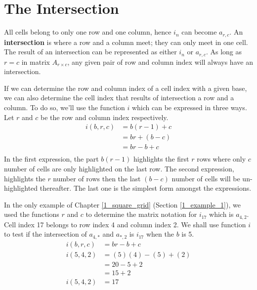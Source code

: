 \documentclass[letterpaper, twoside,12pt]{article}
\begin{document}
    \newpage

    \section{The Intersection} \label{intersection}
    All cells belong to only one row and one column, hence $i_n$ can become $a_{r,c}$. An \textbf{intersection} is where a row and a column meet; they can only meet in one cell. The result of an intersection can be represented as either $i_n$ or $a_{r,c}$. As long as $r=c$ in matrix $A_{r \times c}$, any given pair of row and column index will always have an intersection.

    If we can determine the row and column index of a cell index with a given base, we can also determine the cell index that results of intersection a row and a column. To do so, we'll use the function $i$ which can be expressed in three ways. Let $r$ and $c$ be the row and column index respectively.
    \begin{equation}
        \begin{split}
            i(b,r,c) &= b(r-1) + c \\
                    &= br + (b - c) \\
                    &= br - b + c \\
        \end{split}
    \end{equation}
    In the first expression, the part $b(r-1)$ highlights the first $r$ rows where only $c$ number of cells are only highlighted on the last row. The second expression, highlights the $r$ number of rows then the last $(b - c)$ number of cells will be un-highlighted thereafter. The last one is the simplest form amongst the expressions.

    In the only example of Chapter \ref{1_square_grid} (Section \ref{1_example_1}), we used the functions $r$ and $c$ to determine the matrix notation for $i_{17}$ which is $a_{4,2}$. Cell index 17 belongs to row index 4 and column index 2. We shall use function $i$ to test if the intersection of $a_{4,*}$ and $a_{*,2}$ is $i_{17}$ when the $b$ is 5.
    \begin{equation*}
        \begin{split}
            i(b,r,c) &= br - b + c \\
            i(5,4,2) &= (5)(4) - (5) + (2) \\
                &= 20 - 5 + 2 \\
                &= 15 + 2 \\
            i(5,4,2) &= 17
        \end{split}
    \end{equation*}
\end{document}
